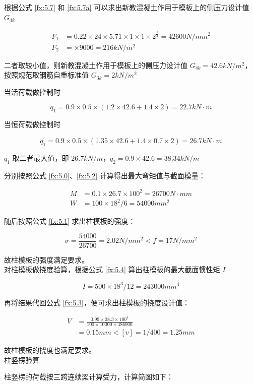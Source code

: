 根据公式 \ref{fx:5.7} 和 \ref{fx:5.7a} 可以求出新教混凝土作用于模板上的侧压力设计值 $G_{4k}$

\begin{align*}
    F_1&=0.22\times 24\times 5.71\times 1\times 1\times 2^{\frac{1}{2}}=42600 N/mm^2\\
    F_2&=\times 9000=216 kN/m^2
\end{align*}

二者取较小值，则新教混凝土作用于模板上的侧压力设计值 $G_{4k}=42.6 kN/m^2$，按照规范取钢筋自重标准值 $G_{3k}=2kN/m^2$

当活荷载做控制时

\[q_1=0.9\times 0.5\times (1.2\times 42.6+1.4\times 2)=22.7kN \cdot m\]

当恒荷载做控制时

\[q_1^{'}=0.9\times 0.5\times (1.35\times 42.6+1.4\times 0.7\times 2)=26.7kN \cdot m\]

$q_1$ 取二者最大值，即 $26.7 kN/m$，$q_2=0.9\times 42.6=38.34 kN/m$

分别按照公式 \ref{fx:5.0}、\ref{fx:5.2} 计算得出最大弯矩值与截面模量：

\begin{align*}
    M&=0.1\times 26.7\times 100^2=26700 N \cdot mm\\
    W&=100\times 18^2 /6=54000 mm^2
\end{align*}

随后按照公式 \ref{fx:5.1} 求出柱模板的强度：

\[
    \sigma = \frac{54000}{26700}=2.02 N/mm^2< f=17N/mm^2
\]

故柱模板的强度满足要求。\\

对柱模板做挠度验算，根据公式 \ref{fx:5.4} 算出柱模板的最大截面惯性矩 $I$

\[
    I=500\times 18^3 /12=243000 mm^4
\]

再将结果代回公式 \ref{fx:5.3}，便可求出柱模板的挠度设计值：

\begin{align*}
    V&=\frac{0.99\times 38.3 \times 100^4}{100\times 10000\times 486000}\\
    &=0.15 mm<[v]=1/400=1.25mm
\end{align*}

故柱模板的挠度也满足要求。\\

 柱竖楞验算

柱竖楞的荷载按三跨连续梁计算受力，计算简图如下：

